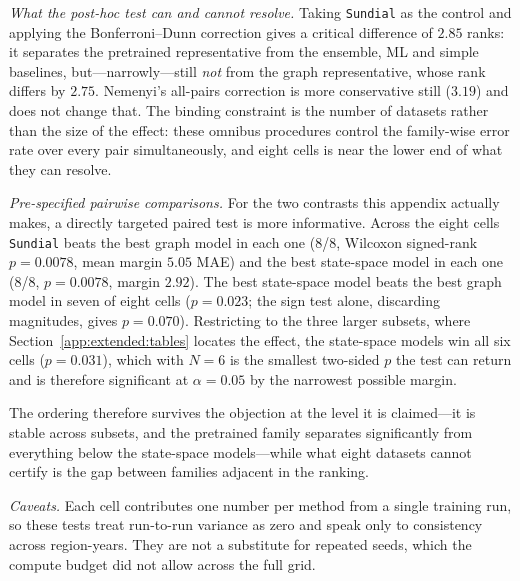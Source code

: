 \textit{What the post-hoc test can and cannot resolve.} Taking \texttt{Sundial}
as the control and applying the Bonferroni--Dunn correction gives a critical
difference of $2.85$ ranks: it separates the pretrained representative from the
ensemble, ML and simple baselines, but---narrowly---still \emph{not} from the
graph representative, whose rank differs by $2.75$. Nemenyi's all-pairs
correction is more conservative still ($3.19$) and does not change that. The
binding constraint is the number of datasets rather than the size of the effect:
these omnibus procedures control the family-wise error rate over every pair
simultaneously, and eight cells is near the lower end of what they can resolve.

\textit{Pre-specified pairwise comparisons.} For the two contrasts this appendix
actually makes, a directly targeted paired test is more informative. Across the
eight cells \texttt{Sundial} beats the best graph model in each one (8/8,
Wilcoxon signed-rank $p = 0.0078$, mean margin $5.05$ MAE) and the best
state-space model in each one (8/8, $p = 0.0078$, margin $2.92$). The best
state-space model beats the best graph model in seven of eight cells
($p = 0.023$; the sign test alone, discarding magnitudes, gives $p = 0.070$).
Restricting to the three larger subsets, where
Section~\ref{app:extended:tables} locates the effect, the state-space models win
all six cells ($p = 0.031$), which with $N=6$ is the smallest two-sided $p$ the
test can return and is therefore significant at $\alpha = 0.05$ by the narrowest
possible margin.

The ordering therefore survives the objection at the level it is claimed---it is
stable across subsets, and the pretrained family separates significantly from
everything below the state-space models---while what eight datasets cannot
certify is the gap between families adjacent in the ranking.

\textit{Caveats.} Each cell contributes one number per method from a single
training run, so these tests treat run-to-run variance as zero and speak only to
consistency across region-years. They are not a substitute for repeated seeds,
which the compute budget did not allow across the full grid.

